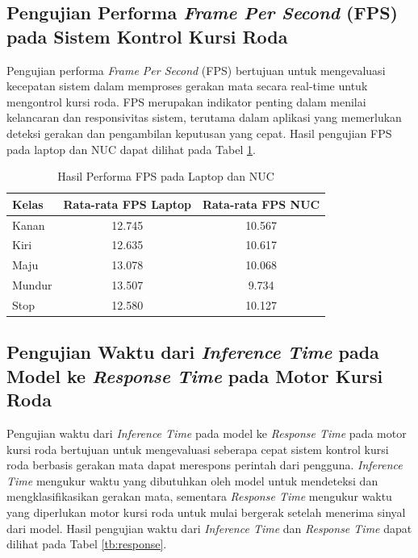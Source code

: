 \subsection{Pengujian Performa \emph{Frame Per Second} (FPS) pada Sistem Kontrol Kursi Roda}

Pengujian performa \emph{Frame Per Second} (FPS) bertujuan untuk mengevaluasi kecepatan sistem dalam memproses gerakan mata secara real-time untuk mengontrol kursi roda. FPS merupakan indikator penting dalam menilai kelancaran dan responsivitas sistem, terutama dalam aplikasi yang memerlukan deteksi gerakan dan pengambilan keputusan yang cepat. Hasil pengujian FPS pada laptop dan NUC dapat dilihat pada Tabel \ref{tb:fps}.

\begin{table}[H]
  \caption{Hasil Performa FPS pada Laptop dan NUC}
  \label{tb:fps}
  \centering
  \begin{tabular}{|l|c|c|}
  \hline
  \rowcolor[HTML]{C0C0C0} 
  \textbf{Kelas} & \textbf{Rata-rata FPS Laptop} & \textbf{Rata-rata FPS NUC} \\ \hline
  Kanan           & 12.745              & 10.567           \\ \hline
  Kiri           & 12.635              & 10.617            \\ \hline
  Maju           & 13.078              & 10.068           \\ \hline
  Mundur           & 13.507              & 9.734           \\ \hline
  Stop           & 12.580              & 10.127            \\ \hline
  \end{tabular}
\end{table}

\subsection{Pengujian Waktu dari \emph{Inference Time} pada Model ke \emph{Response Time} pada Motor Kursi Roda}

Pengujian waktu dari \emph{Inference Time} pada model ke \emph{Response Time} pada motor kursi roda bertujuan untuk mengevaluasi seberapa cepat sistem kontrol kursi roda berbasis gerakan mata dapat merespons perintah dari pengguna. \emph{Inference Time} mengukur waktu yang dibutuhkan oleh model untuk mendeteksi dan mengklasifikasikan gerakan mata, sementara \emph{Response Time} mengukur waktu yang diperlukan motor kursi roda untuk mulai bergerak setelah menerima sinyal dari model. Hasil pengujian waktu dari \emph{Inference Time} dan \emph{Response Time} dapat dilihat pada Tabel \ref{tb:response}.

